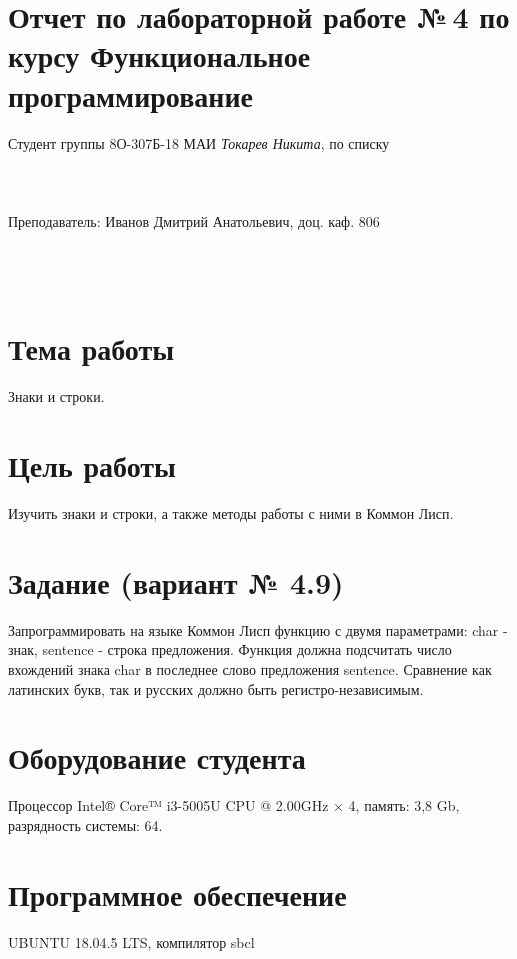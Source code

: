 \documentclass[12pt]{article}
\begin{document}
\section*{Отчет по лабораторной работе №\,4 
по курсу \guillemotleft  Функциональное программирование\guillemotright}
\begin{flushright}
Студент группы 8О-307Б-18 МАИ \textit{Токарев Никита},  по списку \\
 \\
 \\
\ \\
Преподаватель: Иванов Дмитрий Анатольевич, доц. каф. 806 \\
 \\
 \\
 \\

\end{flushright}

\section{Тема работы}
Знаки и строки.

\section{Цель работы}
Изучить  знаки и строки, а также методы работы с ними в Коммон Лисп.

\section{Задание (вариант № 4.9)}
Запрограммировать на языке Коммон Лисп функцию с двумя параметрами: char - знак, sentence - строка предложения. Функция должна подсчитать число вхождений знака char в последнее слово предложения sentence. Сравнение как латинских букв, так и русских должно быть регистро-независимым.


\section{Оборудование студента}
Процессор Intel® Core™ i3-5005U CPU @ 2.00GHz × 4, память: 3,8 Gb, разрядность системы: 64.

\section{Программное обеспечение}
UBUNTU 18.04.5 LTS, компилятор sbcl
\end{document}
